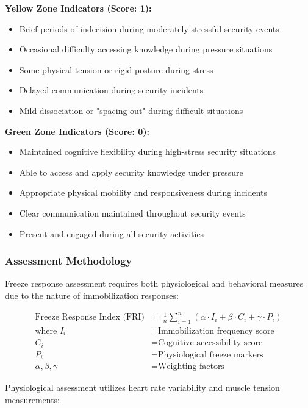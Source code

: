 \documentclass[11pt,a4paper]{article}
\begin{document}
\textbf{Yellow Zone Indicators (Score: 1):}
\begin{itemize}
\item Brief periods of indecision during moderately stressful security events
\item Occasional difficulty accessing knowledge during pressure situations
\item Some physical tension or rigid posture during stress
\item Delayed communication during security incidents
\item Mild dissociation or "spacing out" during difficult situations
\end{itemize}

\textbf{Green Zone Indicators (Score: 0):}
\begin{itemize}
\item Maintained cognitive flexibility during high-stress security situations
\item Able to access and apply security knowledge under pressure
\item Appropriate physical mobility and responsiveness during incidents
\item Clear communication maintained throughout security events
\item Present and engaged during all security activities
\end{itemize}

\subsubsection{Assessment Methodology}

Freeze response assessment requires both physiological and behavioral measures due to the nature of immobilization responses:

\begin{align}
\text{Freeze Response Index (FRI)} &= \frac{1}{n} \sum_{i=1}^{n} \left( \alpha \cdot I_i + \beta \cdot C_i + \gamma \cdot P_i \right) \\
\text{where } I_i &= \text{Immobilization frequency score} \\
C_i &= \text{Cognitive accessibility score} \\
P_i &= \text{Physiological freeze markers} \\
\alpha, \beta, \gamma &= \text{Weighting factors}
\end{align}

Physiological assessment utilizes heart rate variability and muscle tension measurements:
\end{document}
